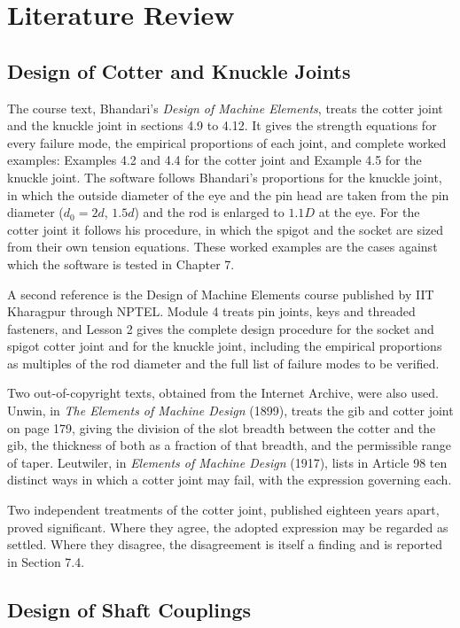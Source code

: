 \chapter{Literature Review}

\section{Design of Cotter and Knuckle Joints}

The course text, Bhandari's \textit{Design of Machine Elements}, treats the cotter joint and the knuckle joint in sections 4.9 to 4.12. It gives the strength equations for every failure mode, the empirical proportions of each joint, and complete worked examples: Examples 4.2 and 4.4 for the cotter joint and Example 4.5 for the knuckle joint. The software follows Bhandari's proportions for the knuckle joint, in which the outside diameter of the eye and the pin head are taken from the pin diameter ($d_0 = 2d$, $1.5d$) and the rod is enlarged to $1.1D$ at the eye. For the cotter joint it follows his procedure, in which the spigot and the socket are sized from their own tension equations. These worked examples are the cases against which the software is tested in Chapter 7.

A second reference is the Design of Machine Elements course published by IIT Kharagpur through NPTEL. Module 4 treats pin joints, keys and threaded fasteners, and Lesson 2 gives the complete design procedure for the socket and spigot cotter joint and for the knuckle joint, including the empirical proportions as multiples of the rod diameter and the full list of failure modes to be verified.

Two out-of-copyright texts, obtained from the Internet Archive, were also used. Unwin, in \textit{The Elements of Machine Design} (1899), treats the gib and cotter joint on page 179, giving the division of the slot breadth between the cotter and the gib, the thickness of both as a fraction of that breadth, and the permissible range of taper. Leutwiler, in \textit{Elements of Machine Design} (1917), lists in Article 98 ten distinct ways in which a cotter joint may fail, with the expression governing each.

Two independent treatments of the cotter joint, published eighteen years apart, proved significant. Where they agree, the adopted expression may be regarded as settled. Where they disagree, the disagreement is itself a finding and is reported in Section 7.4.

\section{Design of Shaft Couplings}

